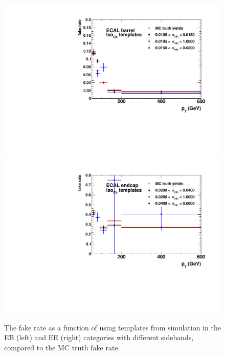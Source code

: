 \begin{figure}[!htbp]
  \centering
  \includegraphics[scale=0.40]{figures/closure_test_fake_rates_chIso_EB.pdf}
  \includegraphics[scale=0.40]{figures/closure_test_fake_rates_chIso_EE.pdf}
  \caption{The fake rate as a function of \pt using \chiso templates from simulation in the EB (left) and EE (right) categories with different \sieie sidebands, compared to the MC truth fake rate.}
  \label{fig:closure_test_fake_rates_chiso}
\end{figure}

